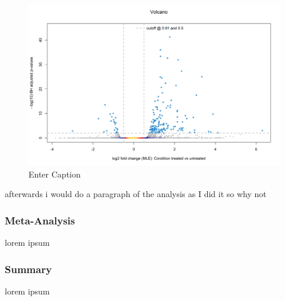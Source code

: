 \begin{figure}
    \centering
    \includegraphics[width=1\linewidth]{07. Chapter 2//Figs/14. rnaseq volcano.png}
    \caption{Enter Caption}
    \label{fig:volcano2}
\end{figure}

afterwards i would do a paragraph of the analysis as I did it so why not

\subsubsection{Meta-Analysis}
lorem ipsum

\subsubsection{Summary}
lorem ipsum